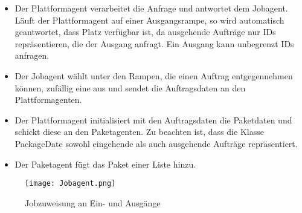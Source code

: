 \begin{itemize}
\item Der Plattformagent verarbeitet die Anfrage und antwortet dem Jobagent. Läuft der Plattformagent auf einer Ausgangsrampe, so wird automatisch geantwortet, dass Platz verfügbar ist, da ausgehende Aufträge nur IDs repräsentieren, die der Ausgang anfragt. Ein Ausgang kann unbegrenzt IDs anfragen.
\item Der Jobagent wählt unter den Rampen, die einen Auftrag entgegennehmen können, zufällig eine aus und sendet die Auftragsdaten an den Plattformagenten.
\item Der Plattformagent initialisiert mit den Auftragsdaten die Paketdaten und schickt diese an den Paketagenten. Zu beachten ist, dass die Klasse PackageDate sowohl eingehende als auch ausgehende Aufträge repräsentiert.
\item Der Paketagent fügt das Paket einer Liste hinzu.
\end{itemize}   
\begin{figure}[h!]
	\centering
		\texttt{[image: Jobagent.png]}        
		\caption{Jobzuweisung an Ein- und Ausgänge}
	\label{Job}
\end{figure}
\newpage
